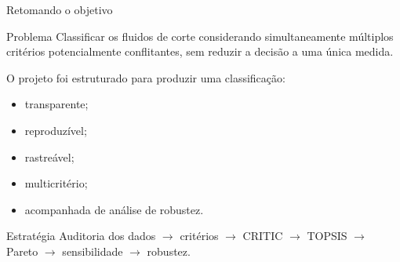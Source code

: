%
%
%
%
%
%
%



\begin{frame}{Retomando o objetivo}

    \begin{block}{Problema}
        Classificar os fluidos de corte considerando simultaneamente
        múltiplos critérios potencialmente conflitantes, sem reduzir
        a decisão a uma única medida.
    \end{block}

    \vspace{0.3cm}

    O projeto foi estruturado para produzir uma classificação:

    \begin{itemize}
        \item transparente;
        \item reproduzível;
        \item rastreável;
        \item multicritério;
        \item acompanhada de análise de robustez.
    \end{itemize}

    \vspace{0.3cm}

    \begin{block}{Estratégia}
        Auditoria dos dados
        $\rightarrow$
        critérios
        $\rightarrow$
        CRITIC
        $\rightarrow$
        TOPSIS
        $\rightarrow$
        Pareto
        $\rightarrow$
        sensibilidade
        $\rightarrow$
        robustez.
    \end{block}

\end{frame}


